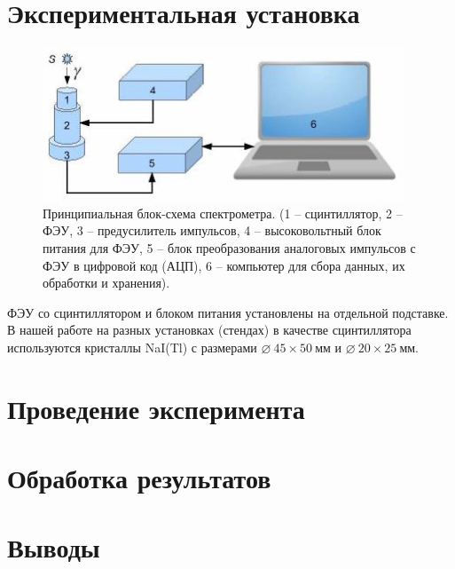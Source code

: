 \documentclass[14pt, a4paper]{report}
\begin{document}
\section{Экспериментальная установка}

\begin{figure}[H]
\centering
\includegraphics[scale=1]{../images/555-1}
\caption{Принципиальная блок-схема спектрометра. (1 -- сцинтиллятор, 2 -- ФЭУ, 3 -- предусилитель импульсов, 4 -- высоковольтный блок питания для ФЭУ, 5 -- блок преобразования аналоговых импульсов с ФЭУ в цифровой код (АЦП), 6 -- компьютер для сбора данных, их обработки и хранения).}
\end{figure}

ФЭУ со сцинтиллятором и блоком питания установлены на отдельной подставке. В нашей работе на разных установках (стендах) в качестве сцинтиллятора используются кристаллы NaI(Tl) с размерами $\diameter\ 45\times50\ мм$ и $\diameter\ 20\times25\ мм$.

\section{Проведение эксперимента}

\section{Обработка результатов}

\section{Выводы}
\end{document}
